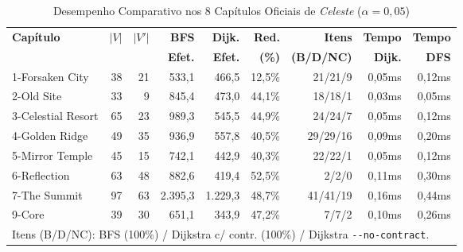 \documentclass[conference]{IEEEtran}
\begin{document}
\begin{table}[!htbp]
\caption{Desempenho Comparativo nos 8 Cap\'itulos Oficiais de \textit{Celeste} ($\alpha = 0{,}05$)}
\label{tab:celeste}
\centering
\scriptsize
\setlength{\tabcolsep}{2.5pt}
\begin{tabular}{lrrrrrrrr}
\toprule
\textbf{Cap\'itulo} & $|V|$ & $|V'|$ & \textbf{BFS} & \textbf{Dijk.} & \textbf{Red.} & \textbf{Itens} & \textbf{Tempo} & \textbf{Tempo} \\
 & & & \textbf{Efet.} & \textbf{Efet.} & \textbf{(\%)} & \textbf{(B/D/NC)} & \textbf{Dijk.} & \textbf{DFS} \\
\midrule
1-Forsaken City    & 38 & 21 &   533,1 &   466,5 & 12,5\% & 21/21/9  & 0,05ms & 0,12ms \\
2-Old Site         & 33 &  9 &   845,4 &   473,0 & 44,1\% & 18/18/1  & 0,03ms & 0,05ms \\
3-Celestial Resort & 65 & 23 &   989,3 &   545,5 & 44,9\% & 24/24/7  & 0,05ms & 0,12ms \\
4-Golden Ridge     & 49 & 35 &   936,9 &   557,8 & 40,5\% & 29/29/16 & 0,09ms & 0,20ms \\
5-Mirror Temple    & 45 & 15 &   742,1 &   442,9 & 40,3\% & 22/22/1  & 0,05ms & 0,12ms \\
6-Reflection       & 63 & 48 &   882,6 &   419,4 & 52,5\% &  2/2/0   & 0,11ms & 0,30ms \\
7-The Summit       & 97 & 63 & 2.395,3 & 1.229,3 & 48,7\% & 41/41/19 & 0,16ms & 0,44ms \\
9-Core             & 39 & 30 &   651,1 &   343,9 & 47,2\% &  7/7/2   & 0,10ms & 0,26ms \\
\bottomrule
\multicolumn{9}{l}{\tiny Itens (B/D/NC): BFS (100\%) / Dijkstra c/ contr. (100\%) / Dijkstra \texttt{-{}-no-contract}.}
\end{tabular}
\end{table}
\end{document}
